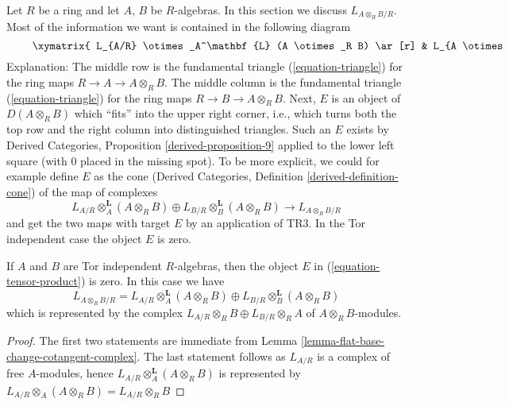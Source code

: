 \noindent
Let $R$ be a ring and let $A$, $B$ be $R$-algebras. In this section we
discuss $L_{A \otimes_R B/R}$. Most of the information we want is contained
in the following diagram
\begin{equation}
\label{equation-tensor-product}
\vcenter{
\xymatrix{
L_{A/R} \otimes_A^\mathbf{L} (A \otimes_R B) \ar[r] &
L_{A \otimes_R B/B} \ar[r] &
E \\
L_{A/R} \otimes_A^\mathbf{L} (A \otimes_R B) \ar[r] \ar@{=}[u] &
L_{A \otimes_R B/R} \ar[r] \ar[u] &
L_{A \otimes_R B/A} \ar[u] \\
 &
L_{B/R} \otimes_B^\mathbf{L} (A \otimes_R B) \ar[u] \ar@{=}[r] &
L_{B/R} \otimes_B^\mathbf{L} (A \otimes_R B) \ar[u]
}
}
\end{equation}
Explanation: The middle row is the fundamental triangle
(\ref{equation-triangle}) for the ring maps $R \to A \to A \otimes_R B$.
The middle column is the fundamental triangle
(\ref{equation-triangle}) for the ring maps $R \to B \to A \otimes_R B$.
Next, $E$ is an object of $D(A \otimes_R B)$ which ``fits'' into the
upper right corner, i.e., which turns both the top row
and the right column into distinguished triangles. Such an $E$
exists by Derived Categories, Proposition \ref{derived-proposition-9}
applied to the lower left square (with $0$ placed in the missing
spot). To be more explicit, we could for example define $E$ as the cone
(Derived Categories, Definition \ref{derived-definition-cone})
of the map of complexes
$$
L_{A/R} \otimes_A^\mathbf{L} (A \otimes_R B) \oplus
L_{B/R} \otimes_B^\mathbf{L} (A \otimes_R B)
\longrightarrow
L_{A \otimes_R B/R}
$$
and get the two maps with target $E$ by an application of TR3.
In the Tor independent case the object $E$ is zero.

\begin{lemma}
\label{lemma-tensor-product-tor-independent}
If $A$ and $B$ are Tor independent $R$-algebras, then the object $E$
in (\ref{equation-tensor-product}) is zero. In this case we have
$$
L_{A \otimes_R B/R} =
L_{A/R} \otimes_A^\mathbf{L} (A \otimes_R B) \oplus
L_{B/R} \otimes_B^\mathbf{L} (A \otimes_R B)
$$
which is represented by the complex
$L_{A/R} \otimes_R B \oplus L_{B/R} \otimes_R A $
of $A \otimes_R B$-modules.
\end{lemma}

\begin{proof}
The first two statements are immediate from
Lemma \ref{lemma-flat-base-change-cotangent-complex}.
The last statement follows as $L_{A/R}$ is a complex
of free $A$-modules, hence $L_{A/R} \otimes_A^\mathbf{L} (A \otimes_R B)$
is represented by
$L_{A/R} \otimes_A (A \otimes_R B) = L_{A/R} \otimes_R B$
\end{proof}

